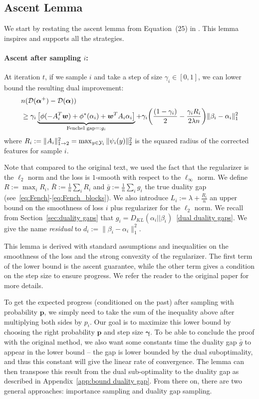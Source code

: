 \subsection{Ascent Lemma}\label{ascent lemma}
We start by restating the ascent lemma from Equation~(25) in \citet{shalev-shwartz_accelerated_2013-1}.
This lemma inspires and supports all the strategies.

\paragraph{Ascent after sampling $i$:}
At iteration $t$, if we sample $i$ and take a step of size  $\gamma_i \in [0,1]$, we can lower bound the resulting dual improvement:
\begin{align}
	\label{one point descent}
	& n ({\mathcal D}(\boldsymbol{\alpha}^+) - {\mathcal D}(\boldsymbol{\alpha})) \notag \\
	& \geq \gamma_i \underbrace{ \big [ \phi(-A_i^T \boldsymbol{w}) + \phi^*(\alpha_i) + \boldsymbol{w}^T A_i \alpha_i \big ] }
	_{ \textrm{Fenchel gap} =: g_i} 
	+ \gamma_i \bigg ( \frac{(1-\gamma_i)}{2} - \frac{\gamma_i R_i}{2 \lambda n} \bigg )\| \beta_i - \alpha_i \|^2_1
\end{align}
where  $R_i := \|A_i\|^2_{1\rightarrow 2}  = \max_{y\in{\mathcal Y}_i} \| \psi_i(y) \|_2^2 $ is the squared radius of the corrected features for sample $i$.

Note that compared to the original text, we used the fact that the regularizer is the $\ell_2$ norm and the loss is $1$-smooth with respect to the $\ell_\infty$ norm.
We define $R:=\max_i R_i$, ${\bar R := \frac{1}{n} \sum_i R_i}$ and $\bar g := \frac{1}{n} \sum_i g_i$ the true duality gap (see~\eqref{eq:Fench}-\eqref{eq:Fench_blocks}).
We also introduce $L_i := \lambda + \frac{R_i}{n}$ an upper bound on the smoothness of loss $i$ plus regularizer for the $\ell_2$ norm.
We recall from Section~\ref{sec:duality gaps} that $g_i = D_{KL}(\alpha_i || \beta_i)$~\eqref{dual duality gaps}.
We give the name \textit{residual} to $d_i := \| \beta_i - \alpha_i \|^2_1$.

This lemma is derived with standard assumptions and inequalities on the smoothness of the loss and the strong convexity of the regularizer.
The first term of the lower bound is the ascent guarantee, while the other term gives a condition on the step size to ensure progress.
We refer the reader to the original paper for more details.

To get the expected progress (conditioned on the past) after sampling with probability $\bm p$, we simply need to take the sum of the inequality above after multiplying both sides by $p_i$.
Our goal is to maximize this lower bound by choosing the right probability $\bm p$ and step size $\bm \gamma$.
To be able to conclude the proof with the original method, we also want some constants time the duality gap $\bar g$ to appear in the lower bound -- the gap is lower bounded by the dual suboptimality, and thus this constant will give the linear rate of convergence.
The lemma can then transpose this result from the dual sub-optimality to the duality gap as described in Appendix~\ref{app:bound duality gap}.
From there on, there are two general approaches: importance sampling and duality gap sampling.

